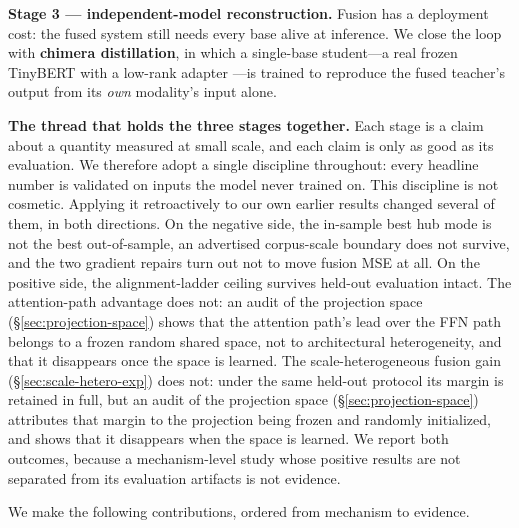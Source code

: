 \documentclass[10pt]{article}
\theoremstyle{definition}
\theoremstyle{plain}
\theoremstyle{remark}
\begin{document}
\textbf{Stage 3 --- independent-model reconstruction.} Fusion has a deployment cost: the fused system still needs every base alive at inference. We close the loop with \textbf{chimera distillation}, in which a single-base student---a real frozen TinyBERT \citep{jiao2020} with a low-rank adapter \citep{hu2022}---is trained to reproduce the fused teacher's output from its \emph{own} modality's input alone.

\textbf{The thread that holds the three stages together.} Each stage is a claim about a quantity measured at small scale, and each claim is only as good as its evaluation. We therefore adopt a single discipline throughout: every headline number is validated on inputs the model never trained on. This discipline is not cosmetic. Applying it retroactively to our own earlier results changed several of them, in both directions. On the negative side, the in-sample best hub mode is not the best out-of-sample, an advertised corpus-scale boundary does not survive, and the two gradient repairs turn out not to move fusion MSE at all. On the positive side, the alignment-ladder ceiling survives held-out evaluation intact. The attention-path advantage does not: an audit of the projection space (\S\ref{sec:projection-space}) shows that the attention path's lead over the FFN path belongs to a frozen random shared space, not to architectural heterogeneity, and that it disappears once the space is learned. The scale-heterogeneous fusion gain (\S\ref{sec:scale-hetero-exp}) does not: under the same held-out protocol its margin is retained in full, but an audit of the projection space (\S\ref{sec:projection-space}) attributes that margin to the projection being frozen and randomly initialized, and shows that it disappears when the space is learned. We report both outcomes, because a mechanism-level study whose positive results are not separated from its evaluation artifacts is not evidence.

We make the following contributions, ordered from mechanism to evidence.
\end{document}
